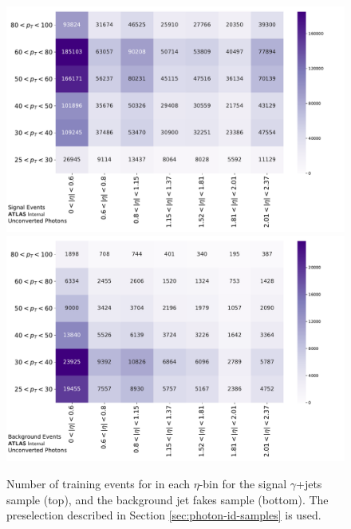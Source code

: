 \begin{figure}[!thp]
    \centering
    \includegraphics[width=.85\textwidth]{chapters/chapter4_photonID/images/sig_events.pdf}
    \includegraphics[width=.85\textwidth]{chapters/chapter4_photonID/images/bkg_events.pdf}
    \caption[Number of training events for in each $\eta$-\pt bin for the signal $\gamma$+jets sample, and the background jet fakes sample]{Number of training events for in each $\eta$-\pt bin for the signal $\gamma$+jets sample (top), and the background jet fakes sample (bottom). The preselection described in Section \ref{sec:photon-id-samples} is used.}
    \label{fig:photonid-events}
\end{figure}

